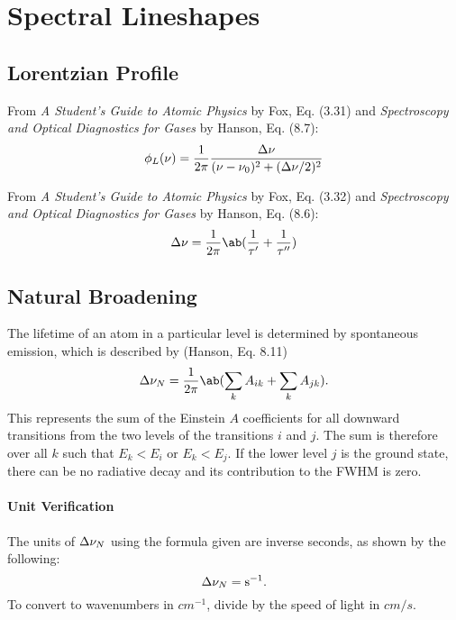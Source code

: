 \documentclass[11pt, twoside, fleqn]{report}
\begin{document}
    \section{Spectral Lineshapes}

    \subsection{Lorentzian Profile}

    From \textit{A Student's Guide to Atomic Physics} by Fox, Eq. (3.31) and \textit{Spectroscopy and Optical Diagnostics for Gases} by Hanson, Eq. (8.7):
    \begin{equation*}
        \phi_{L}(\nu) = \frac{1}{2\pi}\frac{\adif{\nu}}{(\nu - \nu_{0})^{2} + (\adif{\nu}/2)^{2}}
    \end{equation*}

    From \textit{A Student's Guide to Atomic Physics} by Fox, Eq. (3.32) and \textit{Spectroscopy and Optical Diagnostics for Gases} by Hanson, Eq. (8.6):
    \begin{equation*}
        \adif{\nu} = \frac{1}{2\pi}\ab(\frac{1}{\tau'} + \frac{1}{\tau''})
    \end{equation*}

    \subsection{Natural Broadening}

    The lifetime of an atom in a particular level is determined by spontaneous emission, which is described by (Hanson, Eq. 8.11)
    \begin{equation*}
        \adif{\nu}_{N} = \frac{1}{2\pi}\ab(\sum_{k} A_{ik} + \sum_{k} A_{jk}).
    \end{equation*}
    This represents the sum of the Einstein $A$ coefficients for all downward transitions from the two levels of the transitions $i$ and $j$. The sum is therefore over all $k$ such that $E_{k} < E_{i}$ or $E_{k} < E_{j}$. If the lower level $j$ is the ground state, there can be no radiative decay and its contribution to the FWHM is zero.

    \paragraph{Unit Verification}

    The units of $\adif{\nu}_{N}$ using the formula given are inverse seconds, as shown by the following:
    \begin{equation*}
        \adif{\nu}_{N} = \unit{s^{-1}}.
    \end{equation*}
    To convert to wavenumbers in $\unit{cm^{-1}}$, divide by the speed of light in $\unit{cm/s}$.
\end{document}
